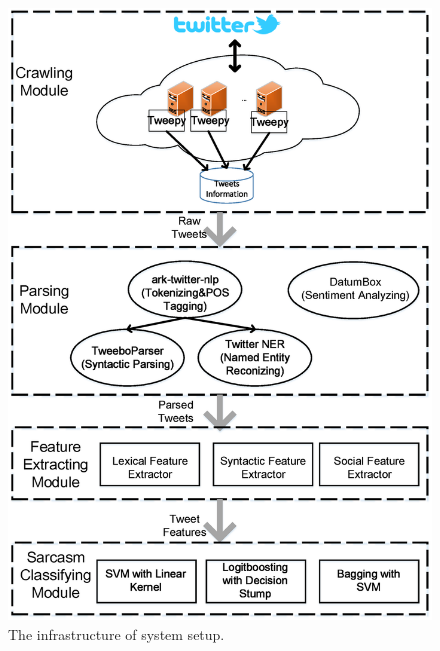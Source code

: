 \begin{figure}[htpb]
\centering
\includegraphics[scale=0.3]{infrastructure.eps}
\caption{The infrastructure of system setup.}
\label{fig:infrastructure}
\end{figure}
